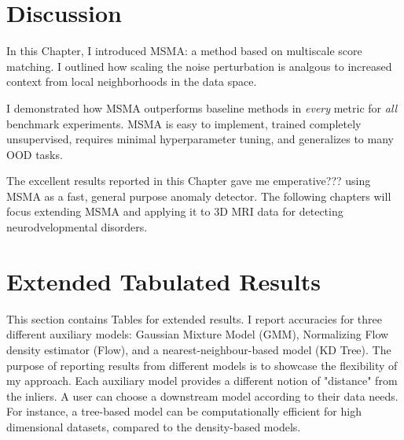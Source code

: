 
\section{Discussion}

In this Chapter, I introduced MSMA: a method based on multiscale score matching. I outlined how scaling the noise perturbation is analgous to increased context from local neighborhoods in the data space.  


I demonstrated how MSMA outperforms baseline methods in \textit{every} metric for \textit{all} benchmark experiments. MSMA is easy to implement, trained completely unsupervised, requires minimal hyperparameter tuning, and generalizes to many OOD tasks.

The excellent results reported in this Chapter gave me emperative??? using MSMA as a fast, general purpose anomaly detector. The following chapters will focus extending MSMA and applying it to 3D MRI data for detecting neurodvelopmental disorders.

\section{Extended Tabulated Results}
\label{msma_extended_results}

This section contains Tables for extended results. I report accuracies for three different auxiliary models: Gaussian Mixture Model (GMM), Normalizing Flow density estimator (Flow), and a nearest-neighbour-based model (KD Tree). The purpose of reporting results from different models is to showcase the flexibility of my approach. Each auxiliary model provides a different notion of "distance" from the inliers. A user can choose a downstream model according to their data needs. For instance, a tree-based model can be computationally efficient for high dimensional datasets, compared to the density-based models.

